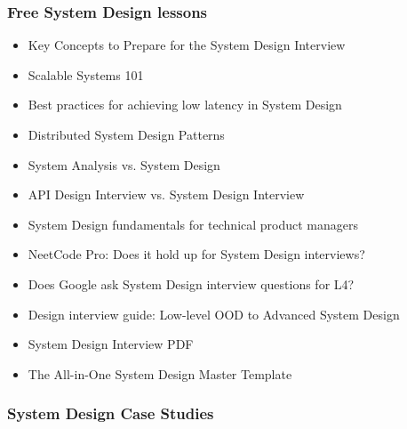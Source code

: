 \subsubsection{Free System Design lessons}\label{AE9oW82se-gKKdMCDZXZp}

\begin{itemize}
\item
\protect{}\label{iTmTIWT5a-0cwnHi3kAcq}
Key Concepts to Prepare for the System Design Interview
\item
\protect{}\label{USGGEyniGx1as-7HkIB3l}
Scalable Systems 101
\item
\protect{}\label{SgiHuhIWPqUBy1bpAgr7E}
Best practices for achieving low latency in System Design
\item
\protect{}\label{s9QozqSjGOX49yk4k_ds3}
Distributed System Design Patterns
\item
\protect{}\label{ohAPaR5FrNGK73ysOm3eo}
System Analysis vs. System Design
\item
\protect{}\label{PoHkpRIX8CXuDykldaM8F}
API Design Interview vs. System Design Interview
\item
\protect{}\label{yvkUntqRs-GwtDOhVo3P-}
System Design fundamentals for technical product managers
\item
\protect{}\label{1agTvwcXZl2bEPSok5M0P}
NeetCode Pro: Does it hold up for System Design interviews?
\item
\protect{}\label{Kv3QiJGH6I-OvK4Io3DKy}
Does Google ask System Design interview questions for L4?
\item
\protect{}\label{tLzltmNC8w2MRUx0_hG6Q}
Design interview guide: Low-level OOD to Advanced System Design
\item
\protect{}\label{VHtgRQAqFkj2K8XRkq7el}
System Design Interview PDF
\item
\protect{}\label{G_lxCIY-KGP5fTmU8K6Tc}
The All-in-One System Design Master Template
\end{itemize}

\subsubsection{System Design Case Studies}\label{CBnAOeV_MLYXgoifMvrKW}


